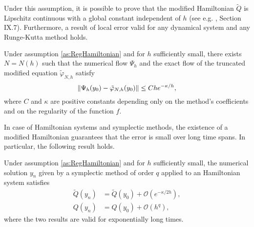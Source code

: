 \documentclass{siamart1116}
\numberwithin{theorem}{section}
\DeclarePairedDelimiter{\norm}{\|}{\|}
\renewcommand{\phi}{\varphi}
\newcommand{\OO}{\mathcal{O}}
\begin{document}
Under this assumption, it is possible to prove that the modified Hamiltonian $\tilde Q$ is Lipschitz continuous with a global constant independent of $h$ (see e.g. \cite{HLW06}, Section IX.7). Furthermore, a result of local error valid for any dynamical system and any Runge-Kutta method holds.

\begin{lemma}\label{lem:LocalHamiltonianDet} Under assumption \ref{as:RegHamiltonian} and for $h$ sufficiently small, there exists $N = N(h)$ such that the numerical flow $\Psi_h$ and the exact flow of the truncated modified equation $\tilde \phi_{N, h}$ satisfy
	\begin{equation}
	\norm{\Psi_h(y_0) - \tilde \phi_{N, h}(y_0)} \leq C h e^{-\kappa / h},
	\end{equation}
	where $C$ and $\kappa$ are positive constants depending only on the method's coefficients and on the regularity of the function $f$.
\end{lemma}

In case of Hamiltonian systems and symplectic methods, the existence of a modified Hamiltonian guarantees that the error is small over long time spans. In particular, the following result holds.

\begin{theorem} Under assumption \ref{as:RegHamiltonian} and for $h$ sufficiently small, the numerical solution $y_n$ given by a symplectic method of order $q$ applied to an Hamiltonian system satisfies
	\begin{align}
		\tilde Q(y_n) &= \tilde Q (y_0) + \OO(e^{-\kappa / 2h}), \\
		Q(y_n) &= Q(y_0) + \OO(h^q),
	\end{align}
	where the two results are valid for exponentially long times.
\end{theorem}
\end{document}
